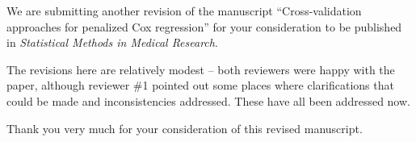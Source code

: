 \documentclass{uiletter}
\begin{document}

We are submitting another revision of the manuscript ``Cross-validation approaches for penalized Cox regression'' for your consideration to be published in \emph{Statistical Methods in Medical Research}.

The revisions here are relatively modest -- both reviewers were happy with the paper, although reviewer \#1 pointed out some places where clarifications that could be made and inconsistencies addressed. These have all been addressed now.

Thank you very much for your consideration of this revised manuscript.

\EndLetter
\end{document}
